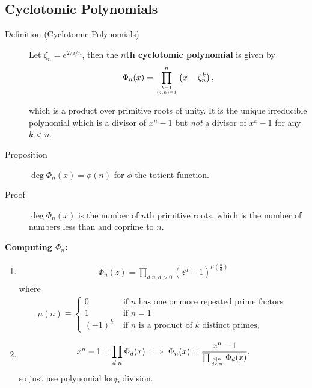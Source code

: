 \hypertarget{cyclotomic-polynomials}{%
\subsection{Cyclotomic Polynomials}\label{cyclotomic-polynomials}}

\begin{description}
\item[Definition (Cyclotomic Polynomials)]
Let \(\zeta_n = e^{2\pi i/n}\), then the \textbf{\(n\)th cyclotomic
polynomial} is given by
\begin{align*}
\Phi_{n}(x)=\prod_{k=1 \atop (j, n)=1}^{n}\left(x- \zeta_n^k\right)
,\end{align*}

which is a product over primitive roots of unity. It is the unique
irreducible polynomial which is a divisor of \(x^n - 1\) but \emph{not}
a divisor of \(x^k-1\) for any \(k<n\).
\item[Proposition]
\(\deg \Phi_n(x) = \phi(n)\) for \(\phi\) the totient function.
\item[Proof]
\(\deg \Phi_n(x)\) is the number of \(n\)th primitive roots, which is
the number of numbers less than and coprime to \(n\).
\end{description}

\textbf{Computing \(\Phi_n\):}

\begin{enumerate}
\def\labelenumi{\arabic{enumi}.}
\item

  \begin{align*}
  \Phi_{n}(z)=\prod_{d | n, d>0}\left(z^{d}-1\right)^{\mu\left(\frac{n}{d}\right)}
  \end{align*} where
  \begin{align*}
  \mu(n) \equiv\left\{\begin{array}{ll}{0} & {\text { if } n \text { has one or more repeated prime factors }} \\ {1} & {\text { if } n=1} \\ {(-1)^{k}} & {\text { if } n \text { is a product of } k \text { distinct primes, }}\end{array}\right.
  \end{align*}
\item

  \begin{align*}
  x^{n}-1=\prod_{d | n} \Phi_{d}(x) \implies \Phi_n(x) = \frac{x^n-1}{\prod_{d | n \atop d < n} \Phi_{d}(x)},
  \end{align*} so just use polynomial long division.
\end{enumerate}

